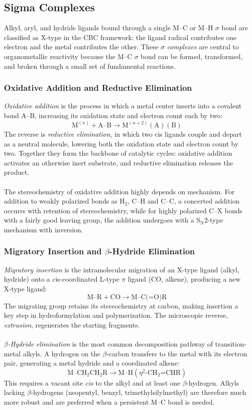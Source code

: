 \subsection{Sigma Complexes}
%
Alkyl, aryl, and hydride ligands bound through a single M--C or M--H $\sigma$ bond
are classified as X-type in the CBC framework:
the ligand radical contributes one electron and the metal contributes the other.
These \emph{$\sigma$ complexes} are central to organometallic reactivity
because the M--C $\sigma$ bond can be formed, transformed, and broken
through a small set of fundamental reactions.
%
\subsubsection{Oxidative Addition and Reductive Elimination}
%
\emph{Oxidative addition} is the process in which a metal center inserts into a covalent bond A--B,
increasing its oxidation state and electron count each by two:
%
\[
	\text{M}^{(n)} + \text{A--B} \longrightarrow \text{M}^{(n+2)}(\text{A})(\text{B})
\]
%
The reverse is \emph{reductive elimination}, in which two cis ligands couple and depart as a neutral molecule,
lowering both the oxidation state and electron count by two.
Together they form the backbone of catalytic cycles:
oxidative addition activates an otherwise inert substrate, and reductive elimination releases the product.\\ \\
%
The stereochemistry of oxidative addition highly depends on mechanism.
For addition to weakly polarized bonds as H$_2$, C--H and C--C, 
a concerted addition occurrs with retention of stereochemistry, 
while for highly polarized C--X bonds with a fairly good leaving group, 
the addition undergoes with a S$_\text{N}$2-type mechanism with inversion.
%
\subsubsection{Migratory Insertion and $\beta$-Hydride Elimination}
%
\emph{Migratory insertion} is the intramolecular migration of an X-type ligand (alkyl, hydride)
onto a cis-coordinated L-type $\pi$ ligand (CO, alkene), producing a new X-type ligand:
%
\[
	\text{M--R} + \text{CO} \longrightarrow \text{M--C(=O)R}
\]
%
The migrating group retains its stereochemistry at carbon,
making insertion a key step in hydroformylation and polymerization.
The microscopic reverse, \emph{extrusion}, regenerates the starting fragments.\\ \\
%
\emph{$\beta$-Hydride elimination} is the most common decomposition pathway of transition-metal alkyls.
A hydrogen on the $\beta$-carbon transfers to the metal with its electron pair,
generating a metal hydride and a coordinated alkene:
%
\[
	\text{M--CH}_2\text{CH}_2\text{R} \longrightarrow \text{M--H}(\eta^2\text{-CH}_2\text{=CHR})
\]
%
This requires a vacant site \emph{cis} to the alkyl and at least one $\beta$-hydrogen.
Alkyls lacking $\beta$-hydrogens (neopentyl, benzyl, trimethylsilylmethyl) are therefore much more robust
and are preferred when a persistent M--C bond is needed.
%

